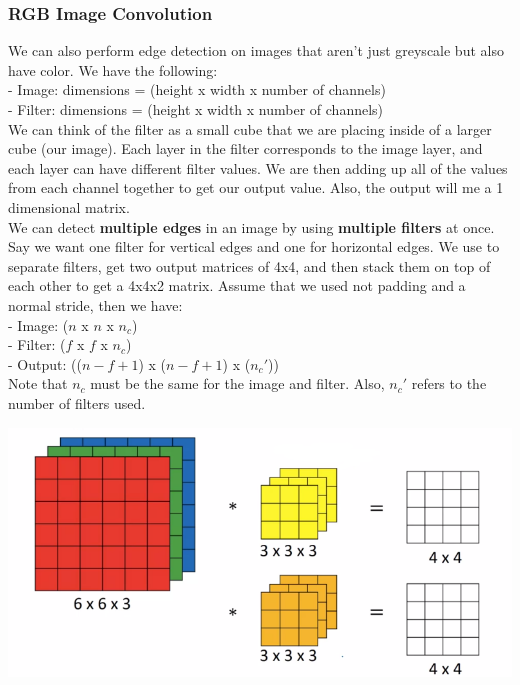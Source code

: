 \documentclass[11pt, a4paper]{article}
\begin{document}
\begin{spacing}{1.1}
	\subsubsection{RGB Image Convolution}
	We can also perform edge detection on images that aren't just greyscale but also have color. We have the following: \\
	\hspace*{3mm} - Image: dimensions = (height x width x number of channels) \\
	\hspace*{3mm} - Filter: dimensions = (height x width x number of channels) \vspace*{1mm} \\
	We can think of the filter as a small cube that we are placing inside of a larger cube (our image). Each layer in the filter corresponds to the image layer, and each layer can have different filter values. We are then adding up all of the values from each channel together to get our output value. Also, the output will me a 1 dimensional matrix. \vspace*{2mm}\\
	We can detect \textbf{multiple edges} in an image by using \textbf{multiple filters} at once. Say we want one filter for vertical edges and one for horizontal edges. We use to separate filters, get two output matrices of 4x4, and then stack them on top of each other to get a 4x4x2 matrix. Assume that we used not padding and a normal stride, then we have: \vspace*{.5mm}\\
	\hspace*{3mm} - Image: ($n$ x $n$ x $n_c$) \\
	\hspace*{3mm} - Filter: ($f$ x $f$ x $n_c$) \\
	\hspace*{3mm} - Output: (($n-f+1$) x ($n-f+1$) x ($n_c'$)) \vspace*{.5mm}\\
	Note that $n_c$ must be the same for the image and filter. Also, $n_c'$ refers to the number of filters used.
	\begin{center} \includegraphics[scale=.5]{mult_filt} \end{center} \newpage
	

\end{spacing}
\end{document}
